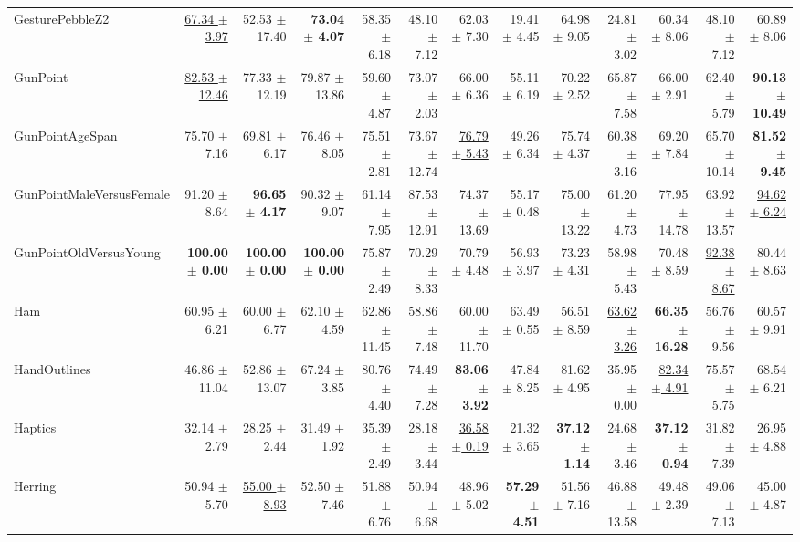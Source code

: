 \begin{landscape}
\begin{longtable}{lrrrrrrrrrrrr}
GesturePebbleZ2 & \underline{67.34 $\pm$ 3.97} & 52.53 $\pm$ 17.40 & \textbf{73.04 $\pm$ 4.07} & 58.35 $\pm$ 6.18 & 48.10 $\pm$ 7.12 & 62.03 $\pm$ 7.30 & 19.41 $\pm$ 4.45 & 64.98 $\pm$ 9.05 & 24.81 $\pm$ 3.02 & 60.34 $\pm$ 8.06 & 48.10 $\pm$ 7.12 & 60.89 $\pm$ 8.06 \\
GunPoint & \underline{82.53 $\pm$ 12.46} & 77.33 $\pm$ 12.19 & 79.87 $\pm$ 13.86 & 59.60 $\pm$ 4.87 & 73.07 $\pm$ 2.03 & 66.00 $\pm$ 6.36 & 55.11 $\pm$ 6.19 & 70.22 $\pm$ 2.52 & 65.87 $\pm$ 7.58 & 66.00 $\pm$ 2.91 & 62.40 $\pm$ 5.79 & \textbf{90.13 $\pm$ 10.49} \\
GunPointAgeSpan & 75.70 $\pm$ 7.16 & 69.81 $\pm$ 6.17 & 76.46 $\pm$ 8.05 & 75.51 $\pm$ 2.81 & 73.67 $\pm$ 12.74 & \underline{76.79 $\pm$ 5.43} & 49.26 $\pm$ 6.34 & 75.74 $\pm$ 4.37 & 60.38 $\pm$ 3.16 & 69.20 $\pm$ 7.84 & 65.70 $\pm$ 10.14 & \textbf{81.52 $\pm$ 9.45} \\
GunPointMaleVersusFemale & 91.20 $\pm$ 8.64 & \textbf{96.65 $\pm$ 4.17} & 90.32 $\pm$ 9.07 & 61.14 $\pm$ 7.95 & 87.53 $\pm$ 12.91 & 74.37 $\pm$ 13.69 & 55.17 $\pm$ 0.48 & 75.00 $\pm$ 13.22 & 61.20 $\pm$ 4.73 & 77.95 $\pm$ 14.78 & 63.92 $\pm$ 13.57 & \underline{94.62 $\pm$ 6.24} \\
GunPointOldVersusYoung & \textbf{100.00 $\pm$ 0.00} & \textbf{100.00 $\pm$ 0.00} & \textbf{100.00 $\pm$ 0.00} & 75.87 $\pm$ 2.49 & 70.29 $\pm$ 8.33 & 70.79 $\pm$ 4.48 & 56.93 $\pm$ 3.97 & 73.23 $\pm$ 4.31 & 58.98 $\pm$ 5.43 & 70.48 $\pm$ 8.59 & \underline{92.38 $\pm$ 8.67} & 80.44 $\pm$ 8.63 \\
Ham & 60.95 $\pm$ 6.21 & 60.00 $\pm$ 6.77 & 62.10 $\pm$ 4.59 & 62.86 $\pm$ 11.45 & 58.86 $\pm$ 7.48 & 60.00 $\pm$ 11.70 & 63.49 $\pm$ 0.55 & 56.51 $\pm$ 8.59 & \underline{63.62 $\pm$ 3.26} & \textbf{66.35 $\pm$ 16.28} & 56.76 $\pm$ 9.56 & 60.57 $\pm$ 9.91 \\
HandOutlines & 46.86 $\pm$ 11.04 & 52.86 $\pm$ 13.07 & 67.24 $\pm$ 3.85 & 80.76 $\pm$ 4.40 & 74.49 $\pm$ 7.28 & \textbf{83.06 $\pm$ 3.92} & 47.84 $\pm$ 8.25 & 81.62 $\pm$ 4.95 & 35.95 $\pm$ 0.00 & \underline{82.34 $\pm$ 4.91} & 75.57 $\pm$ 5.75 & 68.54 $\pm$ 6.21 \\
Haptics & 32.14 $\pm$ 2.79 & 28.25 $\pm$ 2.44 & 31.49 $\pm$ 1.92 & 35.39 $\pm$ 2.49 & 28.18 $\pm$ 3.44 & \underline{36.58 $\pm$ 0.19} & 21.32 $\pm$ 3.65 & \textbf{37.12 $\pm$ 1.14} & 24.68 $\pm$ 3.46 & \textbf{37.12 $\pm$ 0.94} & 31.82 $\pm$ 7.39 & 26.95 $\pm$ 4.88 \\
Herring & 50.94 $\pm$ 5.70 & \underline{55.00 $\pm$ 8.93} & 52.50 $\pm$ 7.46 & 51.88 $\pm$ 6.76 & 50.94 $\pm$ 6.68 & 48.96 $\pm$ 5.02 & \textbf{57.29 $\pm$ 4.51} & 51.56 $\pm$ 7.16 & 46.88 $\pm$ 13.58 & 49.48 $\pm$ 2.39 & 49.06 $\pm$ 7.13 & 45.00 $\pm$ 4.87 \\

\end{longtable}
\end{landscape}
